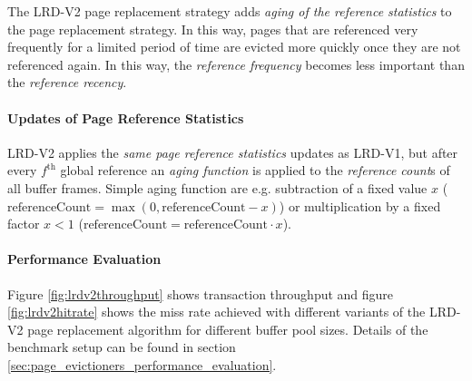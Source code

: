     The LRD-V2 page replacement strategy adds \emph{aging of the reference statistics} to the  page replacement strategy. In this way, pages that are referenced very frequently for a limited period of time are evicted more quickly once they are not referenced again. In this way, the \emph{reference frequency} becomes less important than the \emph{reference recency}.

\paragraph{Updates of Page Reference Statistics}

    LRD-V2 applies the \emph{same page reference statistics} updates as LRD-V1, but after every $f^{\text{th}}$ global reference an \emph{aging function} is applied to the \textit{reference count}s of all buffer frames. Simple aging function are e.g. subtraction of a fixed value $x$ ($\text{referenceCount} = \max\left(0, \text{referenceCount} - x\right)$) or multiplication by a fixed factor $x < 1$ \linebreak ($\text{referenceCount} = \text{referenceCount} \cdot x$).

\paragraph{Performance Evaluation}

    Figure \ref{fig:lrdv2throughput} shows transaction throughput and figure \ref{fig:lrdv2hitrate} shows the miss rate achieved with different variants of the LRD-V2 page replacement algorithm for different buffer pool sizes. Details of the benchmark setup can be found in section \ref{sec:page_evictioners_performance_evaluation}.

